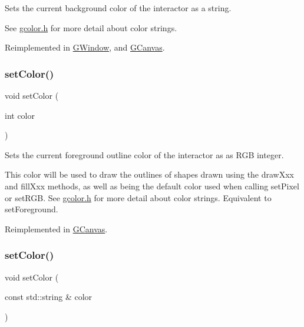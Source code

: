 Sets the current background color of the interactor as a string. 

See \mbox{\hyperlink{gcolor_8h_source}{gcolor.\+h}} for more detail about color strings. 

Reimplemented in \mbox{\hyperlink{classsgl_1_1GWindow_a9cb99695b93494c7ba28268ce9e42c2a}{G\+Window}}, and \mbox{\hyperlink{classsgl_1_1GCanvas_a9cb99695b93494c7ba28268ce9e42c2a}{G\+Canvas}}.

\mbox{\label{classsgl_1_1GDrawingSurface_a75b9cb32ff80bf061791beb01a8433d0}} 
\subsubsection{\texorpdfstring{set\+Color()}{setColor()}\hspace{0.1cm}{\footnotesize\ttfamily [1/2]}}
{\footnotesize\ttfamily void set\+Color (\begin{DoxyParamCaption}\item[{int}]{color }\end{DoxyParamCaption})\hspace{0.3cm}{\ttfamily [virtual]}}



Sets the current foreground outline color of the interactor as as R\+GB integer. 

This color will be used to draw the outlines of shapes drawn using the draw\+Xxx and fill\+Xxx methods, as well as being the default color used when calling set\+Pixel or set\+R\+GB. See \mbox{\hyperlink{gcolor_8h_source}{gcolor.\+h}} for more detail about color strings. Equivalent to set\+Foreground. 

Reimplemented in \mbox{\hyperlink{classsgl_1_1GCanvas_af6e1bcf23a09a0ae0607daff81ee45fa}{G\+Canvas}}.

\mbox{\label{classsgl_1_1GDrawingSurface_a61374df6c11b52cfbb0815decdbaebc6}} 
\subsubsection{\texorpdfstring{set\+Color()}{setColor()}\hspace{0.1cm}{\footnotesize\ttfamily [2/2]}}
{\footnotesize\ttfamily void set\+Color (\begin{DoxyParamCaption}\item[{const std\+::string \&}]{color }\end{DoxyParamCaption})\hspace{0.3cm}{\ttfamily [virtual]}}



